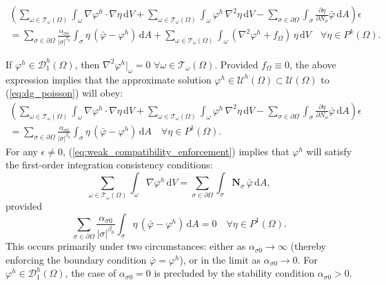 	\begin{eqnarray}
		\left( \sum_{\omega \in \mathcal{T}_\omega (\Omega)} \int_{\omega} \nabla \varphi^h \cdot \nabla \eta \, \mathrm dV
		+ \sum_{\omega \in \mathcal{T}_\omega (\Omega)} \int_{\omega} \varphi^h \, \nabla^2 \eta \, \mathrm dV
		- \sum_{\sigma \in \partial \Omega} \int_{\sigma} \frac{\partial \eta}{\partial N_{\sigma}} \bar{\varphi} \, \mathrm dA \right) \epsilon \nonumber \\ 
		= \sum_{\sigma \in \partial \Omega} \frac{\alpha_{\sigma0}}{|\sigma|^{\beta_0}} \int_{\sigma} \eta \, (\bar{\varphi} - \varphi^h) \, \mathrm dA + \sum_{\omega \in \mathcal{T}_\omega (\Omega)} \int_{\omega} (\nabla^2 \varphi^h + f_{\Omega}) \, \eta \, \mathrm dV \quad \forall \eta \in P^k (\Omega).
	\end{eqnarray}
	
	If $\varphi^h \in \mathcal{D}^h_1 (\Omega)$, then $\nabla^2 \varphi^h|_{\omega} = 0 \, \, \forall \omega \in \mathcal{T}_\omega (\Omega)$. Provided $f_{\Omega} \equiv 0$, the above expression implies that the approximate solution $\varphi^h \in \mathcal{U}^h (\Omega) \subset \mathcal{U} (\Omega)$ to (\ref{eq:dg_poisson}) will obey:
	\begin{eqnarray}
		\left( \sum_{\omega \in \mathcal{T}_\omega (\Omega)} \int_{\omega} \nabla \varphi^h \cdot \nabla \eta \, \mathrm dV
		+ \sum_{\omega \in \mathcal{T}_\omega (\Omega)} \int_{\omega} \varphi^h \, \nabla^2 \eta \, \mathrm dV
		- \sum_{\sigma \in \partial \Omega} \int_{\sigma} \frac{\partial \eta}{\partial N_{\sigma}} \bar{\varphi} \, \mathrm dA \right) \epsilon \nonumber \\ 
		= \sum_{\sigma \in \partial \Omega} \frac{\alpha_{\sigma0}}{|\sigma|^{\beta_0}} \int_{\sigma} \eta \, (\bar{\varphi} - \varphi^h) \, \mathrm dA \quad \forall \eta \in P^1 (\Omega).
		\label{eq:weak_compatibility_enforcement}
	\end{eqnarray}
For any $\epsilon \neq 0$, (\ref{eq:weak_compatibility_enforcement}) implies that $\varphi^h$ will satisfy the first-order integration consistency conditions:
\begin{equation}
		\sum_{\omega \in \mathcal{T}_\omega (\Omega)} \int_{\omega} \nabla \varphi^h \, \mathrm dV = \sum_{\sigma \in \partial \Omega} \int_{\sigma} \bm{N}_{\sigma} \, \bar{\varphi} \, \mathrm dA,
\end{equation}
provided
\begin{equation}
		\sum_{\sigma \in \partial \Omega} \frac{\alpha_{\sigma0}}{|\sigma|^{\beta_0}} \int_{\sigma} \eta \, (\bar{\varphi} - \varphi^h) \, \mathrm dA = 0 \quad \forall \eta \in P^1 (\Omega).
		\label{eq:boundary_condition_enforcement}
\end{equation}
This occurs primarily under two circumstances: either as $\alpha_{\sigma0} \rightarrow \infty$ (thereby enforcing the boundary condition $\bar{\varphi} = \varphi^h$), or in the limit as $\alpha_{\sigma0} \rightarrow 0$. For $\varphi^h \in \mathcal{D}^h_1 (\Omega)$, the case of $\alpha_{\sigma0} = 0$ is precluded by the stability condition $\alpha_{\sigma0} > 0$.

